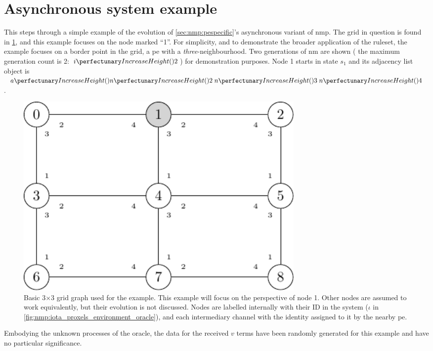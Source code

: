\section{\label{sec:nmp:example}Asynchronous system example}
\newcommand*{\obinnod}[1]{Objects inside node 1 at the end of round #1}
\newcommand*{\obinrul}[2]{Objects inside node 1 after application of rule#1 during round #2}

This  steps through a simple example of the evolution of \cref{sec:nmp:pespecific}'s asynchronous variant of \gls{nmp}.  The grid in question is found in \cref{fig:nmp:basicgrid}, and this example focuses on the node marked ``1''.  For simplicity, and to demonstrate the broader application of the ruleset, the example focuses on a border point in the grid, \ie{} a \gls{pe} with a \emph{three}-neighbourhood.  Two generations of \gls{nm} are shown (\ie{} the maximum generation count is 2: \(\cpfunc{i}{2}\)) for demonstration purposes.  Node 1 starts in state \(s_1\) and its adjacency list object is \(\cpfunc{a}{\cpfunc{n}{2} \; \cpfunc{n}{3} \;\cpfunc{n}{4}}\).

\begin{figure}
    \centering
    \includegraphics[keepaspectratio,width=0.7\textwidth,height=0.3\textheight]{chapters/nmp/images/3by3gridgraph.pdf}
    \caption[Basic 3×3 grid graph used for the example]{Basic 3×3 grid graph used for the example.  This example will focus on the perspective of node 1.  Other nodes are assumed to work equivalently, but their evolution is not discussed.  Nodes are labelled internally with their ID in the system (\(\iota\) in \cref{fig:nmp:iota_proxels_environment_oracle}), and each intermediary channel with the identity assigned to it by the nearby \gls{pe}.}
    \label{fig:nmp:basicgrid}
\end{figure}

Embodying the unknown processes of the oracle, the data for the received \(v\) terms have been randomly generated for this example and have no particular significance.

